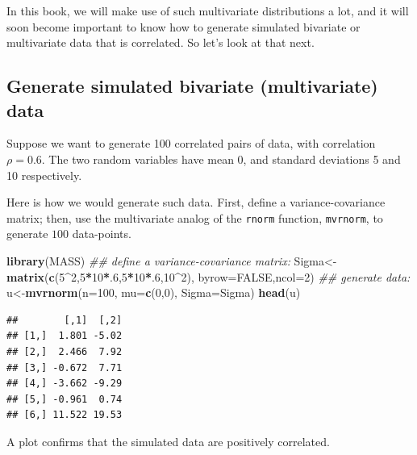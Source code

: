 \documentclass[12pt,]{krantz}
\newenvironment{Shaded}{\begin{snugshade}}{\end{snugshade}}
\newcommand{\CommentTok}[1]{\textcolor[rgb]{0.56,0.35,0.01}{\textit{#1}}}
\newcommand{\DataTypeTok}[1]{\textcolor[rgb]{0.13,0.29,0.53}{#1}}
\newcommand{\DecValTok}[1]{\textcolor[rgb]{0.00,0.00,0.81}{#1}}
\newcommand{\KeywordTok}[1]{\textcolor[rgb]{0.13,0.29,0.53}{\textbf{#1}}}
\newcommand{\NormalTok}[1]{#1}
\newcommand{\OperatorTok}[1]{\textcolor[rgb]{0.81,0.36,0.00}{\textbf{#1}}}
\newcommand{\OtherTok}[1]{\textcolor[rgb]{0.56,0.35,0.01}{#1}}
\theoremstyle{definition}
\theoremstyle{definition}
\theoremstyle{definition}
\theoremstyle{remark}
\begin{document}
In this book, we will make use of such multivariate distributions a lot, and it will soon become important to know how to generate simulated bivariate or multivariate data that is correlated. So let's look at that next.

\hypertarget{generate-simulated-bivariate-multivariate-data}{%
\subsection{Generate simulated bivariate (multivariate) data}\label{generate-simulated-bivariate-multivariate-data}}

Suppose we want to generate 100 correlated pairs of data, with correlation \(\rho=0.6\). The two random variables have mean 0, and standard deviations 5 and 10 respectively.

Here is how we would generate such data. First, define a variance-covariance matrix; then, use the multivariate analog of the \texttt{rnorm} function, \texttt{mvrnorm}, to generate \(100\) data-points.

\begin{Shaded}
\begin{Highlighting}[]
\KeywordTok{library}\NormalTok{(MASS)}
\CommentTok{## define a variance-covariance matrix:}
\NormalTok{Sigma<-}\KeywordTok{matrix}\NormalTok{(}\KeywordTok{c}\NormalTok{(}\DecValTok{5}\OperatorTok{^}\DecValTok{2}\NormalTok{,}\DecValTok{5}\OperatorTok{*}\DecValTok{10}\OperatorTok{*}\NormalTok{.}\DecValTok{6}\NormalTok{,}\DecValTok{5}\OperatorTok{*}\DecValTok{10}\OperatorTok{*}\NormalTok{.}\DecValTok{6}\NormalTok{,}\DecValTok{10}\OperatorTok{^}\DecValTok{2}\NormalTok{),}
              \DataTypeTok{byrow=}\OtherTok{FALSE}\NormalTok{,}\DataTypeTok{ncol=}\DecValTok{2}\NormalTok{)}
\CommentTok{## generate data:}
\NormalTok{u<-}\KeywordTok{mvrnorm}\NormalTok{(}\DataTypeTok{n=}\DecValTok{100}\NormalTok{,}
           \DataTypeTok{mu=}\KeywordTok{c}\NormalTok{(}\DecValTok{0}\NormalTok{,}\DecValTok{0}\NormalTok{),}
           \DataTypeTok{Sigma=}\NormalTok{Sigma)}
\KeywordTok{head}\NormalTok{(u)}
\end{Highlighting}
\end{Shaded}

\begin{verbatim}
##        [,1]  [,2]
## [1,]  1.801 -5.02
## [2,]  2.466  7.92
## [3,] -0.672  7.71
## [4,] -3.662 -9.29
## [5,] -0.961  0.74
## [6,] 11.522 19.53
\end{verbatim}

A plot confirms that the simulated data are positively correlated.
\end{document}
